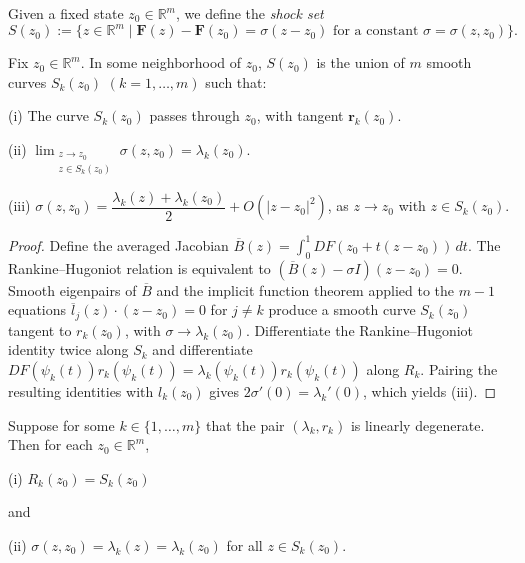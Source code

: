 \begin{definition}
\label{def:shock-set}

Given a fixed state $z_0\in\mathbb{R}^m$, we define the \textit{shock set}
$$S(z_0) := \{z\in\mathbb{R}^m \mid \mathbf{F}(z) - \mathbf{F}(z_0) = \sigma(z-z_0) \text{ for a constant } \sigma = \sigma(z,z_0)\}.$$
\end{definition}

\begin{theorem}
\label{thm:structure-of-shock-set}

Fix $z_0\in\mathbb{R}^m$. In some neighborhood of $z_0$, $S(z_0)$ is the union of $m$ smooth curves $S_k(z_0)$ $(k=1,\ldots,m)$ such that:

(i) The curve $S_k(z_0)$ passes through $z_0$, with tangent $\mathbf{r}_k(z_0)$.

(ii) $\displaystyle\lim_{\substack{z\to z_0 \\ z\in S_k(z_0)}} \sigma(z,z_0) = \lambda_k(z_0)$.

(iii) $\sigma(z,z_0) = \dfrac{\lambda_k(z)+\lambda_k(z_0)}{2} + O(|z-z_0|^2)$, as $z\to z_0$ with $z\in S_k(z_0)$.
\end{theorem}

\begin{proof}
\sketch Define the averaged Jacobian
$\overline B(z)=\int_0^1DF(z_0+t(z-z_0))\,dt$. The Rankine--Hugoniot relation is equivalent to $(\overline B(z)-\sigma I)(z-z_0)=0$. Smooth eigenpairs of $\overline B$ and the implicit function theorem applied to the $m-1$ equations
$\overline l_j(z)\cdot(z-z_0)=0$ for $j\ne k$ produce a smooth curve $S_k(z_0)$ tangent to $r_k(z_0)$, with $\sigma\to\lambda_k(z_0)$. Differentiate the Rankine--Hugoniot identity twice along $S_k$ and differentiate
$DF(\psi_k(t))r_k(\psi_k(t))=\lambda_k(\psi_k(t))r_k(\psi_k(t))$ along $R_k$. Pairing the resulting identities with $l_k(z_0)$ gives $2\sigma'(0)=\lambda_k'(0)$, which yields (iii).
\end{proof}

\begin{theorem}
\label{thm:linear-degeneracy-shock-rarefaction-coincide}

Suppose for some $k\in\{1,\ldots,m\}$ that the pair $(\lambda_k, r_k)$ is linearly degenerate. Then for each $z_0\in\mathbb{R}^m$,

(i) $R_k(z_0) = S_k(z_0)$

and

(ii) $\sigma(z,z_0) = \lambda_k(z) = \lambda_k(z_0)$ for all $z\in S_k(z_0)$.
\end{theorem}

